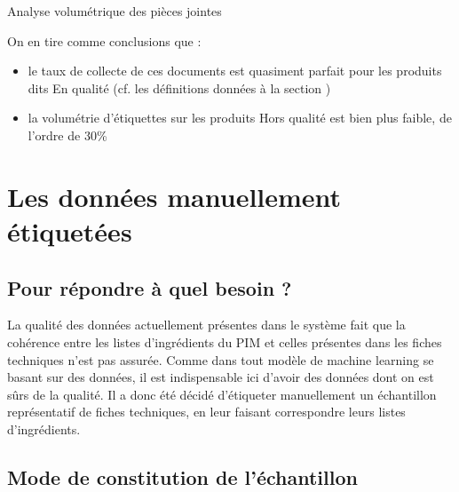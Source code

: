             \begin{table}[htbp]
                \begin{center}
                {\tiny
                
                }
                \caption{Analyse volumétrique des pièces jointes}
                \label{tbl:attached_files_counts}
                \end{center}
            \end{table}

            On en tire comme conclusions que : 
            \begin{itemize}
                \item le taux de collecte de ces documents est quasiment parfait pour les produits dits \og En qualité \fg (cf. les définitions données à la section )
                \item la volumétrie d'étiquettes sur les produits \og Hors qualité \fg est bien plus faible, de l'ordre de 30\%
            \end{itemize}

        \section{Les données \og manuellement étiquetées \fg}
        \label{manually_labelled_data}

            \subsection{Pour répondre à quel besoin ?}

            La qualité des données actuellement présentes dans le système fait que la cohérence entre les listes d'ingrédients du PIM et celles présentes dans les fiches techniques n'est pas assurée.
            Comme dans tout modèle de machine learning se basant sur des données, il est indispensable ici d'avoir des données dont on est sûrs de la qualité.
            Il a donc été décidé d'étiqueter manuellement un échantillon représentatif de fiches techniques, en leur faisant correspondre leurs listes d'ingrédients.

            \subsection{Mode de constitution de l'échantillon}
            
